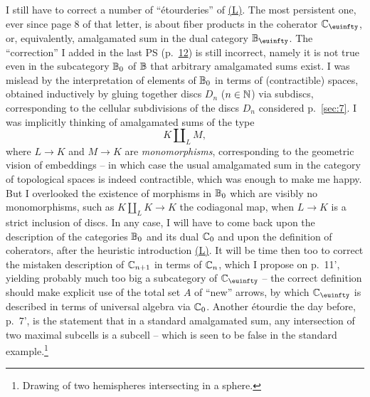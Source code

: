 \bigbreak

\presectionfill{}\par

\label{sec:18}%
I still have to correct a number of ``\'etourderies'' of
\hyperref[ch:I]{(L)}. The most persistent one, ever since page 8 of
that letter, is about fiber products in the coherator $\bC_\oo$, or,
equivalently, amalgamated sum in the dual category $\bB_\oo$. The
``correction'' I added in the last PS (p.\ \hyperref[p:L.12]{12}) is
still incorrect, namely it is not true even in the subcategory ${\mathbb{B}}_0$
of ${\mathbb{B}}$ that arbitrary amalgamated sums exist. I was mislead by the
interpretation of elements of ${\mathbb{B}}_0$ in terms of (contractible)
spaces, obtained inductively by gluing together discs $D_n$
($n\in{\ensuremath{\mathbb{N}}}$) via subdiscs, corresponding to the cellular subdivisions
of the discs $D_n$ considered p.\ \ref{sec:7}. I was implicitly
thinking of amalgamated sums of the type
\[ K \amalg_L M,\]
where $L\to K$ and $M\to K$ are \emph{monomorphisms}, corresponding to
the geometric vision of embeddings -- in which case the usual
amalgamated sum in the category of topological spaces is indeed
contractible, which was enough to make me happy. But I overlooked the
existence of morphisms in ${\mathbb{B}}_0$ which are visibly no
monomorphisms, such as $K \amalg_L K \to K$ the codiagonal map, when
$L \to K$ is a strict inclusion of discs. In any case, I will have to
come back upon the description of the categories ${\mathbb{B}}_0$ and its
dual ${\mathbb{C}}_0$ and upon the definition of coherators, after the
heuristic introduction \hyperref[ch:I]{(L)}. It will be time then too to correct the
mistaken description of ${\mathbb{C}}_{n+1}$ in terms of ${\mathbb{C}}_n$, which I
propose on p.\ 11', yielding probably much too big a subcategory of
$\bC_\oo$ -- the correct definition should make explicit use of the
total set $A$ of ``new'' arrows, by which $\bC_\oo$ is described in
terms of universal algebra via ${\mathbb{C}}_0$. Another \'etourdie the day
before, p.\ 7', is the statement that in a standard amalgamated sum,
any intersection of two maximal subcells is a subcell -- which is seen
to be false in the standard example.\footnote{Drawing of two
  hemispheres intersecting in a sphere.}

